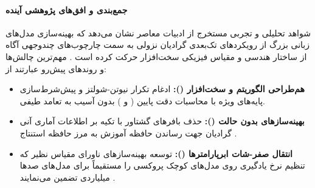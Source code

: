 \paragraph*{جمع‌بندی و افق‌های پژوهشی آینده}
شواهد تحلیلی و تجربی مستخرج از ادبیات معاصر نشان می‌دهد که بهینه‌سازی مدل‌های زبانی بزرگ از رویکردهای تک‌بعدی گرادیان نزولی به سمت چارچوب‌های چندوجهی آگاه از ساختار هندسی و مقیاس فیزیکی سخت‌افزار حرکت کرده است \cite{gan2026beyond, zhang2026evolution}. مهم‌ترین چالش‌ها و روندهای پیش‌رو عبارتند از:
\begin{itemize}
    \item \textbf{هم‌طراحی الگوریتم و سخت‌افزار ():} ادغام تکرار نیوتن-شولتز و پیش‌شرط‌سازی پایه‌های ویژه با محاسبات دقت پایین ( و ) بدون آسیب به تعامد طیفی.
    \item \textbf{بهینه‌سازهای بدون حالت ():} حذف بافرهای گشتاور با تکیه بر اطلاعات آماری آنی گرادیان جهت رساندن حافظه آموزش به مرز حافظه استنتاج \cite{zhang2026evolution}.
    \item \textbf{انتقال صفر-شات ابرپارامترها ():} توسعه بهینه‌سازهای ناورای مقیاس نظیر  که تنظیم نرخ یادگیری روی مدل‌های کوچک پروکسی را مستقیماً برای مدل‌های صدها میلیاردی تضمین می‌نمایند \cite{pethick2025training}.
\end{itemize}